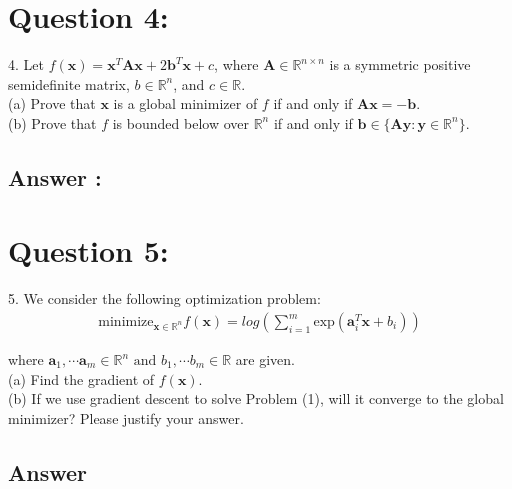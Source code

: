 \documentclass[a4paper,12pt]{article}
\newcommand{\R}{\mathbb{R}}
\begin{document}
\section*{Question 4:}
4. Let \(f(\bm{x}) = \bm{x}^T\bm{A}\bm{x} + 2\bm{b}^T\bm{x} + c\), where \(\bm{A} \in \R^{n \times n}\) is a symmetric positive semidefinite matrix, \(b \in \R^n\), and \(c \in \R\). \\
(a) Prove that \(\bm{x}\) is a global minimizer of \(f\) if and only if \(\bm{A}\bm{x} = -\bm{b}\). \\
(b) Prove that \(f\) is bounded below over \(\R^n\) if and only if \(\bm{b} \in \{\bm{A}\bm{y}: \bm{y} \in \R^n\}\). \\
\subsection*{Answer :}


\section*{Question 5:}
5. We consider the following optimization problem:
\begin{align}
    \text{minimize}_{\bm{x} \in \R^n} f(\bm{x}) = log\left( \sum_{i = 1}^m \text{exp}(\bm{a}_i^T \bm{x} + b_i)\right)
\end{align}

where \(\bm{a}_1, \cdots \bm{a}_m \in \R^n \text{ and } b_1, \cdots b_m \in \R\) are given. \\

(a) Find the gradient of \(f(\bm{x})\). \\
(b) If we use gradient descent to solve Problem (1), will it converge to the global minimizer? Please justify your answer.


\subsection*{Answer}
\end{document}
